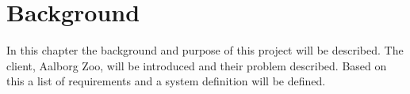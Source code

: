 \chapter{Background}\label{ch:background}
In this chapter the background and purpose of this project will be described. The client, Aalborg Zoo, will be introduced and their problem described. Based on this a list of requirements and a system definition will be defined. 